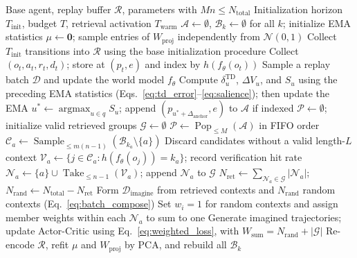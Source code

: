 \documentclass{article} %
\begin{document}
\begin{algorithm}[H]
\caption{FLASH: Fast Latent Anchoring via Salience and Hashing}
\label{alg:flash}
\small
\begin{algorithmic}[1]
\REQUIRE Base agent, replay buffer $\mathcal{R}$, parameters with $Mn\leq N_{\text{total}}$
\REQUIRE Initialization horizon $T_{\text{init}}$, budget $T$, retrieval activation $T_{\text{warm}}$
\STATE $\mathcal{A}\leftarrow\emptyset$, $\mathcal{B}_k\leftarrow\emptyset$ for all $k$; initialize EMA statistics
\STATE $\mu\leftarrow\mathbf{0}$; sample entries of $W_{\text{proj}}$ independently from $\mathcal{N}(0,1)$
\STATE Collect $T_{\text{init}}$ transitions into $\mathcal{R}$ using the base initialization procedure
    \STATE Collect $(o_t,a_t,r_t,d_t)$; store at $(p_t,e)$ and index by $h(f_\theta(o_t))$
    \STATE Sample a replay batch $\mathcal{D}$ and update the world model $f_\theta$
    \STATE Compute $\delta_u^{\mathrm{TD}}$, $\Delta V_u$, and $S_u$ using the preceding EMA statistics (Eqs.~\eqref{eq:td_error}--\eqref{eq:salience}); then update the EMA
            \STATE $u^*\leftarrow\operatorname{argmax}_{u\in q}S_u$; append $(p_{u^*+\Delta_{\text{anchor}}},e)$ to $\mathcal{A}$ if indexed
        \ENDFOR
    \ENDIF
    \STATE $\mathcal{P}\leftarrow\emptyset$; initialize valid retrieved groups $\mathcal{G}\leftarrow\emptyset$
        \STATE $\mathcal{P}\leftarrow\operatorname{Pop}_{\leq M}(\mathcal{A})$ in FIFO order
    \ENDIF
        \STATE $\mathcal{C}_a\leftarrow\operatorname{Sample}_{\leq m(n-1)}(\mathcal{B}_{k_a}\setminus\{a\})$
        \STATE Discard candidates without a valid length-$L$ context
        \STATE $\mathcal{V}_a\leftarrow\{j\in\mathcal{C}_a:h(f_\theta(o_j))=k_a\}$; record verification hit rate
        \STATE $\mathcal{N}_a\leftarrow\{a\}\cup\operatorname{Take}_{\leq n-1}(\mathcal{V}_a)$; append $\mathcal{N}_a$ to $\mathcal{G}$
    \ENDFOR
    \STATE $N_{\text{ret}}\leftarrow\sum_{\mathcal{N}_a\in\mathcal{G}}|\mathcal{N}_a|$; $N_{\text{rand}}\leftarrow N_{\text{total}}-N_{\text{ret}}$
    \STATE Form $\mathcal{D}_{\text{imagine}}$ from retrieved contexts and $N_{\text{rand}}$ random contexts (Eq.~\eqref{eq:batch_compose})
    \STATE Set $w_i=1$ for random contexts and assign member weights within each $\mathcal{N}_a$ to sum to one
    \STATE Generate imagined trajectories; update Actor-Critic using Eq.~\eqref{eq:weighted_loss}, with $W_{\text{sum}}=N_{\text{rand}}+|\mathcal{G}|$
        \STATE Re-encode $\mathcal{R}$, refit $\mu$ and $W_{\text{proj}}$ by PCA, and rebuild all $\mathcal{B}_k$
    \ENDIF
\ENDFOR
\end{algorithmic}
\end{algorithm}
\end{document}
